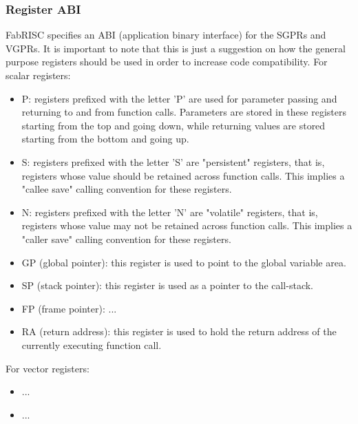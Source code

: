 \documentclass{article}
\begin{document}

            \subsubsection{Register ABI}

                FabRISC specifies an ABI (application binary interface) for the SGPRs and VGPRs. It is important to note that this is just a suggestion on how the general purpose registers should be used in order to increase code compatibility. For scalar registers:

                \begin{itemize}

                    \item P: registers prefixed with the letter 'P' are used for parameter passing and returning to and from function calls. Parameters are stored in these registers starting from the top and going down, while returning values are stored starting from the bottom and going up.

                    \item S: registers prefixed with the letter 'S' are "persistent" registers, that is, registers whose value should be retained across function calls. This implies a "callee save" calling convention for these registers.

                    \item N: registers prefixed with the letter 'N' are "volatile" registers, that is, registers whose value may not be retained across function calls. This implies a "caller save" calling convention for these registers.

                    \item GP (global pointer): this register is used to point to the global variable area.
                    \item SP (stack pointer): this register is used as a pointer to the call-stack.
                    \item FP (frame pointer): ...
                    \item RA (return address): this register is used to hold the return address of the currently executing function call.

                \end{itemize}

                For vector registers:

                \begin{itemize}

                    \item ...
                    \item ...

                \end{itemize}
\end{document}

